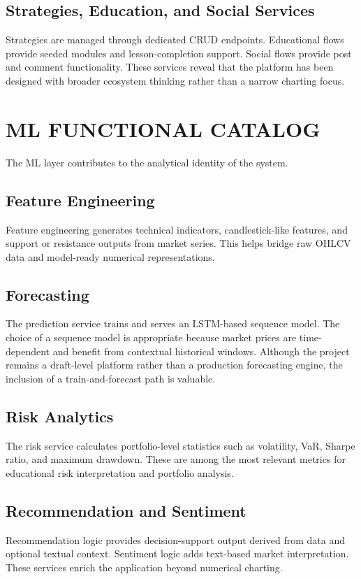 \documentclass[12pt,a4paper]{report}
\begin{document}
\subsection{Strategies, Education, and Social Services}
Strategies are managed through dedicated CRUD endpoints. Educational flows provide seeded modules and lesson-completion support. Social flows provide post and comment functionality. These services reveal that the platform has been designed with broader ecosystem thinking rather than a narrow charting focus.

\section{ML FUNCTIONAL CATALOG}
The ML layer contributes to the analytical identity of the system.

\subsection{Feature Engineering}
Feature engineering generates technical indicators, candlestick-like features, and support or resistance outputs from market series. This helps bridge raw OHLCV data and model-ready numerical representations.

\subsection{Forecasting}
The prediction service trains and serves an LSTM-based sequence model. The choice of a sequence model is appropriate because market prices are time-dependent and benefit from contextual historical windows. Although the project remains a draft-level platform rather than a production forecasting engine, the inclusion of a train-and-forecast path is valuable.

\subsection{Risk Analytics}
The risk service calculates portfolio-level statistics such as volatility, VaR, Sharpe ratio, and maximum drawdown. These are among the most relevant metrics for educational risk interpretation and portfolio analysis.

\subsection{Recommendation and Sentiment}
Recommendation logic provides decision-support output derived from data and optional textual context. Sentiment logic adds text-based market interpretation. These services enrich the application beyond numerical charting.
\end{document}
